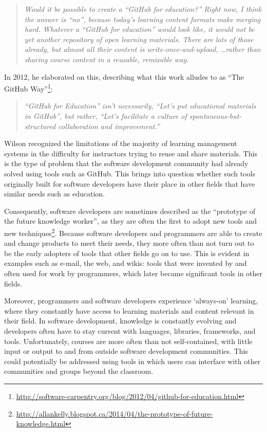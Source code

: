 \begin{quote}\textit{Would it be possible to create a ``GitHub for education?'' Right now, I think the answer is ``no'', because today's learning content formats make merging hard. Whatever a ``GitHub for education'' would look like, it would not be yet another repository of open learning materials. There are lots of those already, but almost all their content is write-once-and-upload, \ldots rather than sharing course content in a reusable, remixable way.}\end{quote}

In 2012, he elaborated on this, describing what this work alludes to as ``The GitHub Way''\footnote{\url{http://software-carpentry.org/blog/2012/04/github-for-education.html}}:

\begin{quote}\textit{``GitHub for Education'' isn’t necessarily, ``Let’s put educational materials in GitHub'', but rather, ``Let’s facilitate a culture of spontaneous-but-structured collaboration and improvement.''}\end{quote}

Wilson recognized the limitations of the majority of learning management systems in the difficulty for instructors trying to reuse and share materials. This is the type of problem that the software development community had already solved using tools such as GitHub. This brings into question whether such tools originally built for software developers have their place in other fields that have similar needs such as education.

Consequently, software developers are sometimes described as the ``prototype of the future knowledge worker'', as they are often the first to adopt new tools and new techniques\footnote{\url{http://allankelly.blogspot.ca/2014/04/the-prototype-of-future-knowledge.html}}. Because software developers and programmers are able to create and change products to meet their needs, they more often than not turn out to be the early adopters of tools that other fields go on to use. This is evident in examples such as e-mail, the web, and wikis: tools that were invented by and often used for work by programmers, which later became significant tools in other fields.


Moreover, programmers and software developers experience `always-on' learning, where they constantly have access to learning materials and content relevant in their field. In software development, knowledge is constantly evolving and developers often have to stay current with languages, libraries, frameworks, and tools. Unfortunately, courses are more often than not self-contained, with little input or output to and from outside software development communities. This could potentially be addressed using tools in which users can interface with other communities and groups beyond the classroom.

